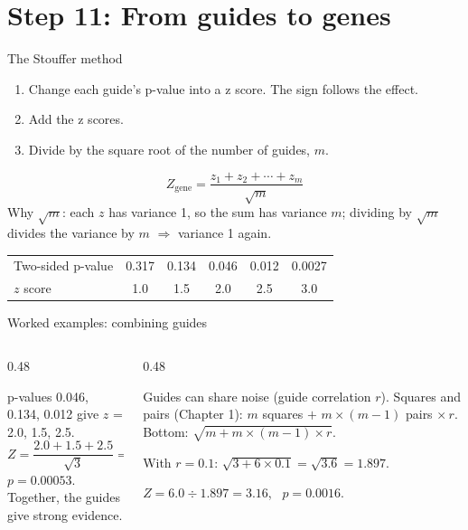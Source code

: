 \documentclass[aspectratio=169,11pt]{beamer}
\begin{document}
\section{Step 11: From guides to genes}

\begin{frame}{The Stouffer method}
\begin{enumerate}
\item Change each guide's p-value into a \alert{z score}. The sign follows
  the effect.
\item Add the z scores.
\item Divide by the square root of the number of guides, $m$.
\end{enumerate}
\[
Z_{\text{gene}} = \frac{z_1 + z_2 + \cdots + z_m}{\sqrt{m}}
\]
{\small Why $\sqrt{m}$: each $z$ has variance 1, so the sum has variance $m$;
dividing by $\sqrt{m}$ divides the variance by $m$ $\Rightarrow$ variance 1
again.}
\begin{center}
\small
\begin{tabular}{lccccc}
\toprule
Two-sided p-value & 0.317 & 0.134 & 0.046 & 0.012 & 0.0027\\
$z$ score & 1.0 & 1.5 & 2.0 & 2.5 & 3.0\\
\bottomrule
\end{tabular}
\end{center}
\end{frame}

\begin{frame}{Worked examples: combining guides}
\begin{columns}[T]
\begin{column}{0.48\textwidth}
\begin{worked}
\small
p-values 0.046, 0.134, 0.012 give $z$ = 2.0, 1.5, 2.5.
\[
Z = \frac{2.0 + 1.5 + 2.5}{\sqrt{3}} = \frac{6.0}{1.732} = 3.46
\]
$p = 0.00053$. Together, the guides give strong evidence.
\end{worked}
\end{column}
\begin{column}{0.48\textwidth}
\begin{worked}
\small
Guides can share noise (\alert{guide correlation} $r$). Squares and pairs
(Chapter 1): $m$ squares $+$ $m \times (m-1)$ pairs $\times\, r$. Bottom:
$\sqrt{m + m \times (m-1) \times r}$.

With $r = 0.1$: $\sqrt{3 + 6 \times 0.1} = \sqrt{3.6} = 1.897$.

$Z = 6.0 \div 1.897 = 3.16$, \ $p = 0.0016$.
\end{worked}
\end{column}
\end{columns}
\end{frame}
\end{document}
